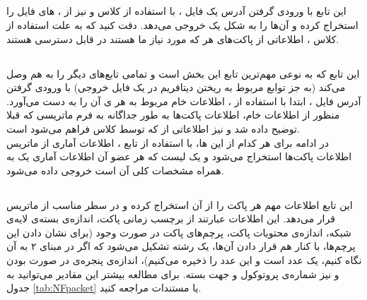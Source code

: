 \subsection{}
این تابع با ورودی گرفتن آدرس یک فایل ، با استفاده از کلاس  و نیز 
 از 
،
‌های
فایل را استخراج کرده و آن‌ها را به شکل یک  خروجی می‌دهد. دقت کنید که به علت استفاده از کلاس
 ،
 اطلاعاتی از پاکت‌های هر  که مورد نیاز ما هستند در 
قابل دسترسی هستند.\\
\subsection{}
این تابع که به نوعی مهم‌ترین تابع این بخش است و تمامی تابع‌های دیگر را به هم وصل می‌کند (به جز توابع مربوط به ریختن دیتافریم در یک فایل خروجی) با ورودی گرفتن  آدرس فایل
،
ابتدا با استفاده از 
،
اطلاعات خام مربوط به هر 
ی
آن را به دست می‌آورد. منظور از اطلاعات خام، اطلاعات پاکت‌ها به طور جداگانه به فرم ماتریسی که قبلا توضیح داده شد و نیز اطلاعاتی از  که توسط کلاس  فراهم می‌شود است.\\
در ادامه برای هر کدام از این ‌ها، با استفاده از تابع 
،
اطلاعات آماری  از ماتریس اطلاعات پاکت‌ها استخراج می‌شود و یک لیست که هر عضو آن اطلاعات آماری یک  به همراه مشخصات کلی آن است خروجی داده می‌شود.\\
\subsection{}
این تابع اطلاعات مهم هر پاکت را از آن استخراج کرده و در سطر مناسب از ماتریس قرار می‌دهد. این اطلاعات عبارتند از برچسب زمانی پاکت، اندازه‌ی بسته‌ی لایه‌ی شبکه، اندازه‌ی محتویات پاکت، پرچم‌های  پاکت در صورت وجود (برای نشان دادن این پرچم‌ها، با کنار هم قرار دادن آن‌ها، یک رشته تشکیل می‌شود که اگر در مبنای ۲ به آن نگاه کنیم، یک عدد است و این عدد را ذخیره می‌کنیم)، اندازه‌ی پنجره‌ی  در صورت  بودن و نیز شماره‌ی پروتوکول و جهت بسته. برای مطالعه بیشتر این مقادیر می‌توانید به جدول 
\ref{tab:NFpacket}
یا مستندات  مراجعه کنید.

